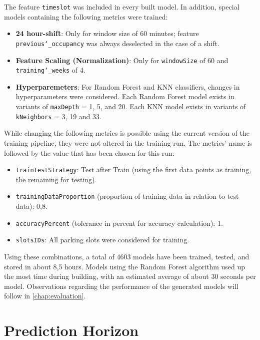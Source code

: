  The feature \texttt{timeslot} was included in every built model. In addition, special models containing the following metrics were trained:
 
 \begin{itemize}
 	\item \textbf{24 hour-shift}: Only for window size of 60 minutes; feature \texttt{previous\char`_occupancy} was always deselected in the case of a shift. 
\item \textbf{Feature Scaling (Normalization)}: Only for \texttt{windowSize} of 60 and \texttt{training\char`_weeks} of 4.
\item \textbf{Hyperparemeters}: For Random Forest and KNN classifiers, changes in hyperparameters were considered. Each Random Forest model exists in variants of \texttt{maxDepth} = 1, 5, and 20. Each KNN model exists in variants of \texttt{kNeighbors} = 3, 19 and 33.
 \end{itemize}
 
 While changing the following metrics is possible using the current version of the training pipeline, they were not altered in the training run. The metrics’ name is followed by the value that has been chosen for this run:
 
 \begin{itemize}
 	\item \texttt{trainTestStrategy}: Test after Train (using the first data points as training, the remaining for testing).
\item \texttt{trainingDataProportion} (proportion of training data in relation to test data): 0,8.
\item \texttt{accuracyPercent} (tolerance in percent for accuracy calculation): 1.
\item \texttt{slotsIDs}: All parking slots were considered for training.
 \end{itemize}
 
 Using these combinations, a total of 4603 models have been trained, tested, and stored in about 8,5 hours. Models using the Random Forest algorithm used up the most time during building, with an estimated average of about 30 seconds per model. Observations regarding the performance of the generated models will follow in \autoref{chap:evaluation}.
 
 
 
 \section{Prediction Horizon}

